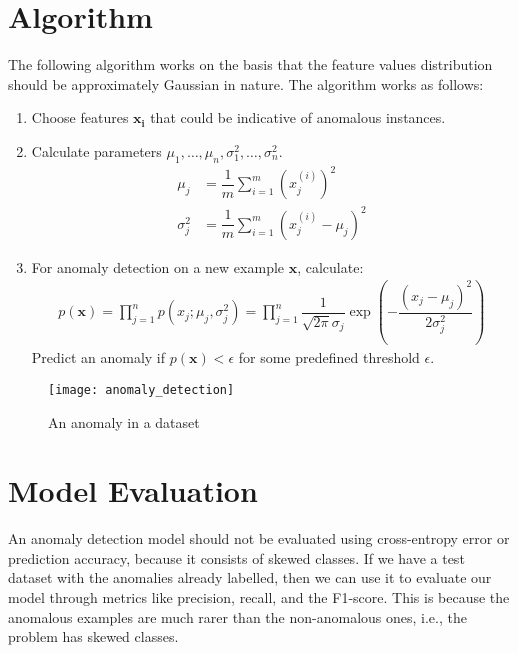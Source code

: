 \documentclass[a4paper, 12pt]{report}
\begin{document}
\section{Algorithm}
The following algorithm works on the basis that the feature values distribution should be approximately Gaussian in nature. The algorithm works as follows:
\begin{enumerate}
\item Choose features $\bm{x_i}$ that could be indicative of anomalous instances.
\item Calculate parameters $\mu_1, \dots, \mu_n, \sigma_1^2, \dots, \sigma_n^2$.
\begin{align*}
\mu_j &= \dfrac{1}{m}\sum_{i=1}^{m}\left(x_j^{\left(i\right)}\right)^2 \\
\sigma_j^2 &= \dfrac{1}{m}\sum_{i=1}^{m}\left(x_j^{\left(i\right)} - \mu_j\right)^2
\end{align*}
\item For anomaly detection on a new example $\bm{x}$, calculate:
\begin{align*}
p\left(\bm{x}\right) = \prod_{j=1}^{n}p\left(x_j; \mu_j, \sigma_j^2\right) = \prod_{j=1}^{n}\dfrac{1}{\sqrt{2\pi}\sigma_j}\exp\left(-\dfrac{\left(x_j-\mu_j\right)^2}{2\sigma_j^2}\right)
\end{align*}
Predict an anomaly if $p(\bm{x}) < \epsilon$ for some predefined threshold $\epsilon$.
\end{enumerate}
\begin{figure}[H]
\centering
\texttt{[image: anomaly\_detection]}
\caption{An anomaly in a dataset}
\end{figure}

\section{Model Evaluation}
An anomaly detection model should not be evaluated using cross-entropy error or prediction accuracy, because it consists of skewed classes. If we have a test dataset with the anomalies already labelled, then we can use it to evaluate our model through metrics like precision, recall, and the F1-score. This is because the anomalous examples are much rarer than the non-anomalous ones, i.e., the problem has skewed classes.
\end{document}
